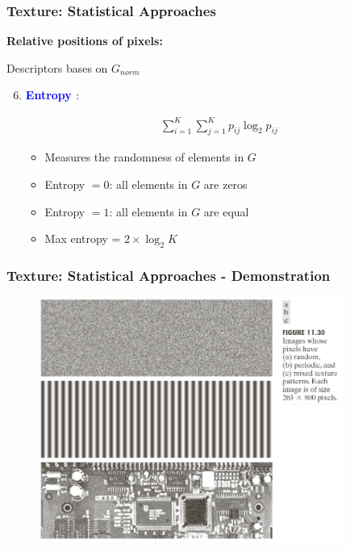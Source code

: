 \documentclass[english,11pt,table,handout]{beamer}
\begin{document}
\frame
{
	\frametitle{Texture: Statistical Approaches}
	\large
	\textbf{Relative positions of pixels: }
	\newline
	\begin{block}{Descriptors bases on $G_{norm}$}
		\begin{enumerate}
			\setcounter{enumi}{5}
			\item \textbf{\textcolor{blue}{Entropy } }:
			
			\begin{equation}
			\begin{split}
			\nonumber
			\sum_{i=1}^{K}{ \sum_{j=1}^{K} { p_{ij}\log_{2}{p_{ij}} } }
			\end{split}
			\end{equation}
			
			\begin{itemize}
				\item Measures the randomness of elements in $G$ 
				\item Entropy $= 0$: all elements in $G$ are zeros
				\item Entropy $= 1$: all elements in $G$ are equal
				\item Max entropy = $2 \times \log_2{K}$
				
			\end{itemize}
			
		\end{enumerate}
		
	\end{block}
}


\frame
{
	\frametitle{Texture: Statistical Approaches - Demonstration}
	\begin{figure}[!h]
		\includegraphics[width=10cm]{texture_4.png}
	\end{figure}
}
\end{document}
